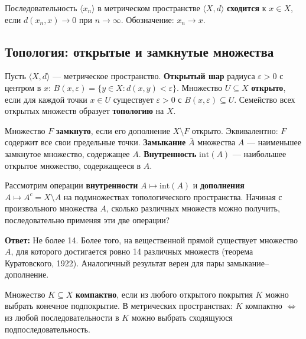 \documentclass[11pt, a4paper]{extarticle}
\newcommand{\ep}{\varepsilon}
\begin{document}
\begin{definition}
Последовательность $\langle x_n \rangle$ в метрическом пространстве $\langle X, d \rangle$ \textbf{сходится} к $x \in X$, если $d(x_n, x) \to 0$ при $n \to \infty$. Обозначение: $x_n \to x$.
\end{definition}

\subsection{Топология: открытые и замкнутые множества}

\begin{definition}
Пусть $\langle X, d \rangle$ --- метрическое пространство. \textbf{Открытый шар} радиуса $\ep > 0$ с центром в $x$: $B(x, \ep) = \{y \in X : d(x,y) < \ep\}$. Множество $U \subseteq X$ \textbf{открыто}, если для каждой точки $x \in U$ существует $\ep > 0$ с $B(x,\ep) \subseteq U$. Семейство всех открытых множеств образует \textbf{топологию} на $X$.
\end{definition}

\begin{definition}
Множество $F$ \textbf{замкнуто}, если его дополнение $X \setminus F$ открыто. Эквивалентно: $F$ содержит все свои предельные точки. \textbf{Замыкание} $\overline{A}$ множества $A$ --- наименьшее замкнутое множество, содержащее $A$. \textbf{Внутренность} $\mathrm{int}(A)$ --- наибольшее открытое множество, содержащееся в $A$.
\end{definition}

\begin{theorem}
Рассмотрим операции \textbf{внутренности} $A \mapsto \mathrm{int}(A)$ и \textbf{дополнения} $A \mapsto A^c = X \setminus A$ на подмножествах топологического пространства. Начиная с произвольного множества $A$, сколько различных множеств можно получить, последовательно применяя эти две операции?

\textbf{Ответ:} Не более 14. Более того, на вещественной прямой существует множество $A$, для которого достигается ровно 14 различных множеств (теорема Куратовского, 1922). Аналогичный результат верен для пары замыкание--дополнение.
\end{theorem}

\begin{definition}[Компактность]
Множество $K \subseteq X$ \textbf{компактно}, если из любого открытого покрытия $K$ можно выбрать конечное подпокрытие. В метрических пространствах: $K$ компактно $\iff$ из любой последовательности в $K$ можно выбрать сходящуюся подпоследовательность.
\end{definition}
\end{document}
